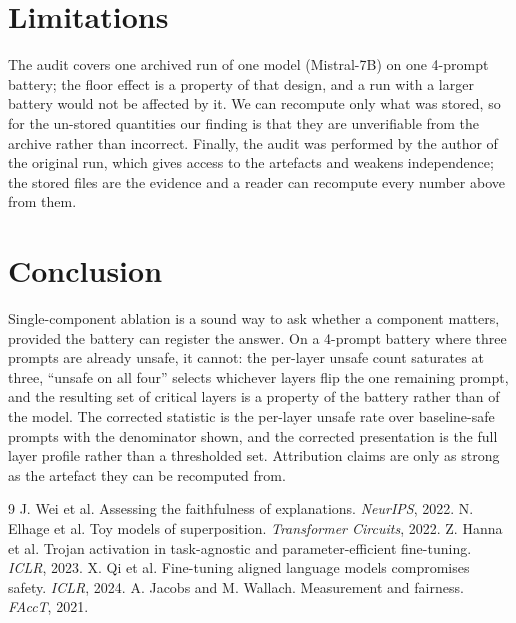 \documentclass[11pt]{article}
\begin{document}
\section{Limitations}
The audit covers one archived run of one model (Mistral-7B) on one 4-prompt battery; the floor effect is a property of that design, and a run with a larger battery would not be affected by it. We can recompute only what was stored, so for the un-stored quantities our finding is that they are unverifiable from the archive rather than incorrect. Finally, the audit was performed by the author of the original run, which gives access to the artefacts and weakens independence; the stored files are the evidence and a reader can recompute every number above from them.

\section{Conclusion}
Single-component ablation is a sound way to ask whether a component matters, provided the battery can register the answer. On a 4-prompt battery where three prompts are already unsafe, it cannot: the per-layer unsafe count saturates at three, ``unsafe on all four'' selects whichever layers flip the one remaining prompt, and the resulting set of critical layers is a property of the battery rather than of the model. The corrected statistic is the per-layer unsafe rate over baseline-safe prompts with the denominator shown, and the corrected presentation is the full layer profile rather than a thresholded set. Attribution claims are only as strong as the artefact they can be recomputed from.

\begin{thebibliography}{9}
 J. Wei et al. Assessing the faithfulness of explanations. \emph{NeurIPS}, 2022.
 N. Elhage et al. Toy models of superposition. \emph{Transformer Circuits}, 2022.
 Z. Hanna et al. Trojan activation in task-agnostic and parameter-efficient fine-tuning. \emph{ICLR}, 2023.
 X. Qi et al. Fine-tuning aligned language models compromises safety. \emph{ICLR}, 2024.
 A. Jacobs and M. Wallach. Measurement and fairness. \emph{FAccT}, 2021.
\end{thebibliography}
\end{document}
